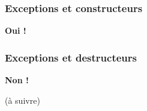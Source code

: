 \documentclass{beamer}
\begin{document}
\begin{frame}[fragile=singleslide,shrink=20]
\frametitle {Exceptions et constructeurs}

\begin{centering}
\textbf{Oui !}
\end{centering}

\end{frame}

\begin{frame}[fragile=singleslide,shrink=20]
\frametitle {Exceptions et destructeurs}

\begin{centering}
\textbf{Non !}
\end{centering}

\end{frame}

\begin{frame}
(à suivre)
\end{frame}
\end{document}
